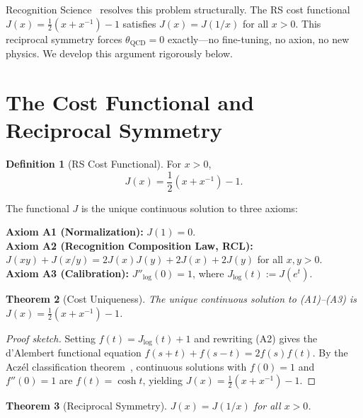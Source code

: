 \documentclass[12pt,a4paper]{article}
\newtheorem{theorem}{Theorem}[section]
\theoremstyle{definition}
\newtheorem{definition}[theorem]{Definition}
\theoremstyle{remark}
\begin{document}
Recognition Science~\cite{RS_Axioms} resolves this problem
structurally.  The RS cost functional
$J(x) = \frac{1}{2}(x + x^{-1}) - 1$ satisfies $J(x) = J(1/x)$
for all $x > 0$.  This reciprocal symmetry forces
$\theta_{\mathrm{QCD}} = 0$ exactly---no fine-tuning, no axion, no
new physics.  We develop this argument rigorously below.

\section{The Cost Functional and Reciprocal Symmetry}
\label{sec:cost}

\begin{definition}[RS Cost Functional]
For $x > 0$,
\begin{equation}
J(x) = \frac{1}{2}\left(x + x^{-1}\right) - 1.
\end{equation}
\end{definition}

\noindent The functional $J$ is the unique continuous solution to
three axioms:

\noindent\textbf{Axiom A1 (Normalization):} $J(1) = 0$.\\
\textbf{Axiom A2 (Recognition Composition Law, RCL):}
$J(xy) + J(x/y) = 2J(x)J(y) + 2J(x) + 2J(y)$ for all $x, y > 0$.\\
\textbf{Axiom A3 (Calibration):} $J''_{\log}(0) = 1$, where
$J_{\log}(t) := J(e^t)$.

\begin{theorem}[Cost Uniqueness]
\label{thm:unique}
The unique continuous solution to \textup{(A1)--(A3)} is
$J(x) = \tfrac{1}{2}(x + x^{-1}) - 1$.
\end{theorem}

\begin{proof}[Proof sketch]
Setting $f(t) = J_{\log}(t) + 1$ and rewriting \textup{(A2)} gives
the d'Alembert functional equation $f(s+t) + f(s-t) = 2f(s)f(t)$.
By the Acz\'el classification theorem~\cite{Aczel1966}, continuous
solutions with $f(0) = 1$ and $f''(0) = 1$ are $f(t) = \cosh t$,
yielding $J(x) = \tfrac{1}{2}(x + x^{-1}) - 1$.
\end{proof}

\begin{theorem}[Reciprocal Symmetry]
\label{thm:reciprocal}
$J(x) = J(1/x)$ for all $x > 0$.
\end{theorem}
\end{document}
